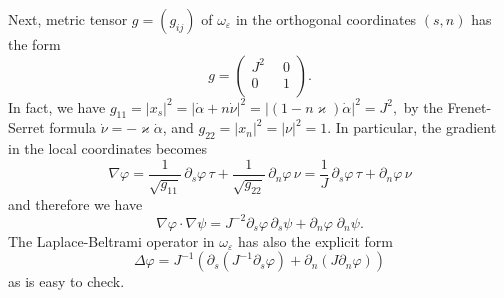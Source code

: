 \documentclass[graybox]{svmult}
\renewcommand{\kappa}{\varkappa}
\newcommand{\eps}{\varepsilon}
\renewcommand{\phi}{\varphi}
\begin{document}
Next, metric tensor $g=(g_{ij})$ of $\omega_\eps$ in the orthogonal coordinates $(s,n)$  has the form
$$
    g=\left(
        \begin{array}{cc}
          J^2\phantom{0} & 0 \\
          0\phantom{0} & 1\\
        \end{array}
      \right).
$$
In fact, we have
$
g_{11}=|x_s|^2=|\dot{\alpha}+n \dot{\nu}|^2
=|(1-n\kappa) \dot{\alpha}|^2=J^2,
$
by the Frenet-Serret formula $\dot{\nu}=-\kappa \dot{\alpha}$, and $g_{22}=|x_n|^2=|\nu|^2=1$.
In particular,  the gradient in the local coordinates becomes
$$
 \nabla \phi=\frac1{\sqrt{g_{11}}}\,\partial_s\phi\, \tau+\frac1{\sqrt{g_{22}}}\,\partial_n\phi\, \nu=\frac1J\,\partial_s\phi\, \tau+\partial_n\phi\, \nu
$$
and  therefore we have
\begin{equation}\label{ScalarProdGrads}
  \nabla \phi\cdot \nabla \psi=J^{-2}\partial_s\phi\, \partial_s \psi+
\partial_n \phi\; \partial_n \psi.
\end{equation}
The Laplace-Beltrami operator in $\omega_\eps$ has also the explicit form
\begin{equation}\label{LaplacianInSN}
\Delta \phi=J^{-1}\left(\partial_s(J^{-1}\partial_s \phi)+ \partial_n(J\partial_n \phi)\right)
\end{equation}
as is easy to check.
%
\end{document}
